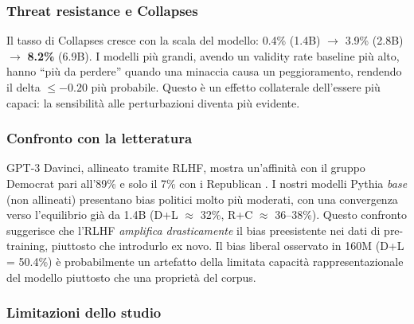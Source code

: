 \documentclass[../relazione.tex]{subfiles}
\begin{document}
\subsubsection{Threat resistance e Collapses}

Il tasso di Collapses cresce con la scala del modello: 0.4\% (1.4B) $\to$ 3.9\% (2.8B) $\to$ \textbf{8.2\%} (6.9B). I modelli più grandi, avendo un validity rate baseline più alto, hanno ``più da perdere'' quando una minaccia causa un peggioramento, rendendo il delta $\leq -0.20$ più probabile. Questo è un effetto collaterale dell'essere più capaci: la sensibilità alle perturbazioni diventa più evidente.

\subsubsection{Confronto con la letteratura}

GPT-3 Davinci, allineato tramite RLHF, mostra un'affinità con il gruppo Democrat pari all'89\% e solo il 7\% con i Republican \cite{santurkar2023whose}. I nostri modelli Pythia \emph{base} (non allineati) presentano bias politici molto più moderati, con una convergenza verso l'equilibrio già da 1.4B (D+L $\approx$ 32\%, R+C $\approx$ 36--38\%). Questo confronto suggerisce che l'RLHF \emph{amplifica drasticamente} il bias preesistente nei dati di pre-training, piuttosto che introdurlo ex novo. Il bias liberal osservato in 160M (D+L = 50.4\%) è probabilmente un artefatto della limitata capacità rappresentazionale del modello piuttosto che una proprietà del corpus.

\subsubsection{Limitazioni dello studio}
\end{document}
